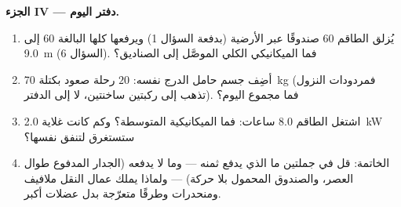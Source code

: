 \begin{problem}
\medskip
\noindent\textbf{الجزء IV --- دفتر اليوم.}
\begin{enumerate}[resume]
  \item يُزلق الطاقم $60$ صندوقًا عبر الأرضية (بدفعة
        السؤال 1) ويرفعها كلها البالغة $60$ إلى \qty{9.0}{m}
        (السؤال 6). فما  الميكانيكي الكلي الموصَّل إلى الصناديق؟
  \item أضِف جسم حامل الدرج نفسه: $20$ رحلة صعود بكتلة \qty{70}{kg}
        (فمردودات النزول تذهب إلى ركبتين ساخنتين، لا إلى الدفتر). فما
        مجموع اليوم؟
  \item اشتغل الطاقم $8.0$ ساعات: فما  الميكانيكية المتوسطة؟ وكم
        كانت غلاية \qty{2.0}{kW} ستستغرق لتنفق  نفسها؟
  \item الخاتمة: قل في جملتين ما الذي يدفع  ثمنه --- وما
        لا يدفعه (الجدار المدفوع طوال العصر، والصندوق المحمول
        بلا حركة) --- ولماذا يملك عمال النقل ملافيف ومنحدرات وطرقًا
        متعرّجة بدل عضلات أكبر.
\end{enumerate}
\end{problem}
